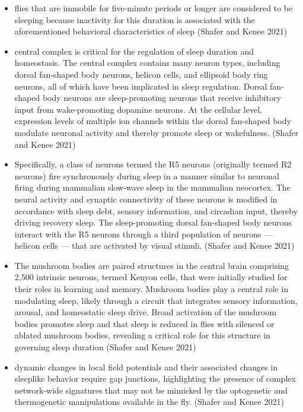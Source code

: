 \documentclass[11pt]{article}
\begin{document}
\begin{itemize}
    \item flies that are immobile for five-minute periods or longer are considered to be sleeping because inactivity for this duration is associated with the aforementioned behavioral characteristics of sleep
    \parencite{shaferRegulationDrosophilaSleep2021} (Shafer and Kenee 2021)

    \item central complex is critical for the regulation of sleep duration and homeostasis. The central complex contains many neuron types, including dorsal fan-shaped body neurons, helicon cells, and ellipsoid body ring neurons, all of which have been implicated in sleep regulation.
    Dorsal fan-shaped body neurons are sleep-promoting neurons that receive inhibitory input from wake-promoting dopamine neurons.
    At the cellular level, expression levels of multiple ion channels within the dorsal fan-shaped body modulate neuronal activity and thereby promote sleep or wakefulness.
    \parencite{shaferRegulationDrosophilaSleep2021} (Shafer and Kenee 2021)

    \item Specifically, a class of neurons termed the R5 neurons (originally termed R2 neurons) fire synchronously during sleep in a manner similar to neuronal firing during mammalian slow-wave sleep in the mammalian neocortex.
    The neural activity and synaptic connectivity of these neurons is modified in accordance with sleep debt, sensory information, and circadian input, thereby driving recovery sleep.
    The sleep-promoting dorsal fan-shaped body neurons interact with the R5 neurons through a third population of
    neurons — helicon cells — that are activated by visual stimuli.
    \parencite{shaferRegulationDrosophilaSleep2021} (Shafer and Kenee 2021)

    \item The mushroom bodies are paired structures in the central brain comprising 2,500 intrinsic neurons, termed Kenyon cells, that were initially studied for their roles in learning and memory.
    Mushroom bodies play a central role in modulating sleep, likely through a circuit that integrates sensory information, arousal, and homeostatic sleep drive.
    Broad activation of the mushroom bodies promotes sleep and that sleep is reduced in flies with silenced or ablated mushroom bodies, revealing a critical role for this structure in governing sleep duration
    \parencite{shaferRegulationDrosophilaSleep2021} (Shafer and Kenee 2021)

    \item dynamic changes in local field potentials and their associated changes in sleeplike behavior require gap junctions, highlighting the presence of complex network-wide signatures that may not be mimicked by the optogenetic and thermogenetic manipulations available in the fly.
    \parencite{shaferRegulationDrosophilaSleep2021} (Shafer and Kenee 2021)


\end{itemize}
\end{document}
